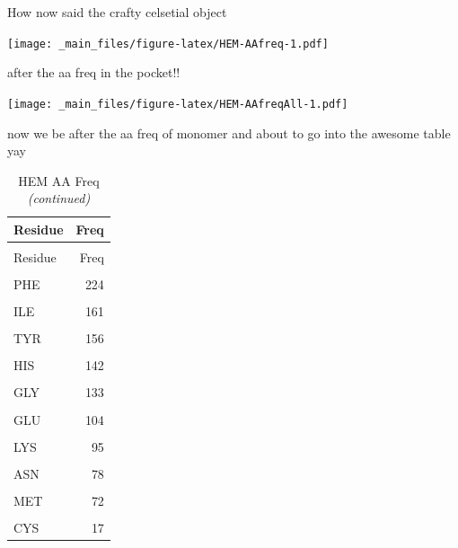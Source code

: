 \documentclass[a4paper, nobind]{templates/ociamthesis}
\let\origfigure\figure
\let\endorigfigure\endfigure
\renewenvironment{figure}[1][2] {
    \expandafter\origfigure\expandafter[H]
} {
    \endorigfigure
}
\begin{document}
How now said the crafty celsetial object

\begin{figure}
\centering
\texttt{[image: \_main\_files/figure-latex/HEM-AAfreq-1.pdf]}
\caption{\label{fig:HEM-AAfreq}HEM: AA Frequency within 7A}
\end{figure}

after the aa freq in the pocket!!

\begin{figure}
\centering
\texttt{[image: \_main\_files/figure-latex/HEM-AAfreqAll-1.pdf]}
\caption{\label{fig:HEM-AAfreqAll}HEM: AA Frequency of Monomer}
\end{figure}

now we be after the aa freq of monomer and about to go into the awesome table yay

\begin{longtable}[t]{lr}
\caption{\label{tab:HEM-t-AAfreq}HEM AA Freq}\\
\toprule
Residue & Freq\\
\midrule
\endfirsthead
\caption[]{\label{tab:HEM-t-AAfreq}HEM AA Freq \textit{(continued)}}\\
\toprule
Residue & Freq\\
\midrule
\endhead

\endfoot
\bottomrule
\endlastfoot
\cellcolor{gray!6}{LEU} & \cellcolor{gray!6}{261}\\
PHE & 224\\
\cellcolor{gray!6}{ALA} & \cellcolor{gray!6}{188}\\
ILE & 161\\
\cellcolor{gray!6}{VAL} & \cellcolor{gray!6}{158}\\
\addlinespace
TYR & 156\\
\cellcolor{gray!6}{ARG} & \cellcolor{gray!6}{146}\\
HIS & 142\\
\cellcolor{gray!6}{THR} & \cellcolor{gray!6}{142}\\
GLY & 133\\
\addlinespace
\cellcolor{gray!6}{SER} & \cellcolor{gray!6}{129}\\
GLU & 104\\
\cellcolor{gray!6}{ASP} & \cellcolor{gray!6}{99}\\
LYS & 95\\
\cellcolor{gray!6}{PRO} & \cellcolor{gray!6}{84}\\
\addlinespace
ASN & 78\\
\cellcolor{gray!6}{GLN} & \cellcolor{gray!6}{78}\\
MET & 72\\
\cellcolor{gray!6}{TRP} & \cellcolor{gray!6}{60}\\
CYS & 17\\*
\end{longtable}
\end{document}
